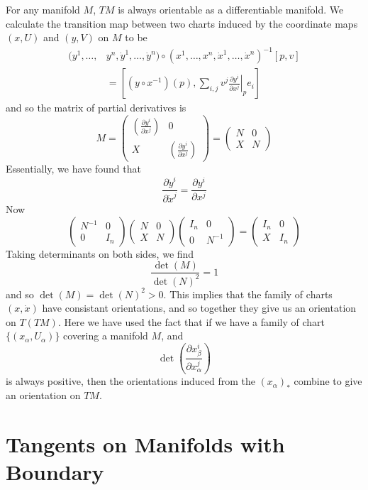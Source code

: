 For any manifold $M$, $TM$ is always orientable as a differentiable manifold. We calculate the transition map between two charts induced by the coordinate maps $(x,U)$ and $(y,V)$ on $M$ to be
%
\begin{align*}
    (y^1, \dots, &y^n, \dot{y}^1, \dots, \dot{y}^n) \circ (x^1, \dots, x^n, \dot{x}^1, \dots, \dot{x}^n)^{-1}[p, v]\\
    &= \left[ (y \circ x^{-1})(p), \sum_{i,j} v^j \left. \frac{\partial y^i}{\partial x^j} \right|_p e_i \right]
\end{align*}
%
and so the matrix of partial derivatives is
%
\[ M = \begin{pmatrix} \left( \frac{\partial y^i}{\partial x^j} \right) & 0 \\ X & \left( \frac{\partial y^i}{\partial x^j} \right) \end{pmatrix} = \begin{pmatrix} N & 0 \\ X & N \end{pmatrix} \]
%
Essentially, we have found that
%
\[ \frac{\partial \dot{y}^i}{\partial \dot{x}^j} = \frac{\partial y^i}{\partial x^j} \]
%
Now
%
\[ \begin{pmatrix} N^{-1} & 0 \\ 0 & I_n \end{pmatrix} \begin{pmatrix} N & 0 \\ X & N \end{pmatrix} \begin{pmatrix} I_n & 0 \\ 0 & N^{-1} \end{pmatrix} = \begin{pmatrix} I_n & 0 \\ X & I_n \end{pmatrix} \]
%
Taking determinants on both sides, we find
%
\[ \frac{\det(M)}{\det(N)^2} = 1 \]
%
and so $\det(M) = \det(N)^2 > 0$. This implies that the family of charts $(x,\dot{x})$ have consistant orientations, and so together they give us an orientation on $T(TM)$. Here we have used the fact that if we have a family of chart $\{ (x_\alpha, U_\alpha) \}$ covering a manifold $M$, and
%
\[ \det \left(\frac{\partial x^i_\beta}{\partial x^j_\alpha}\right) \]
%
is always positive, then the orientations induced from the $(x_\alpha)_*$ combine to give an orientation on $TM$.

\section{Tangents on Manifolds with Boundary}

